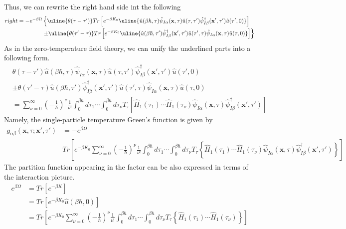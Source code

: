 Thus, we can rewrite the right hand side int the following
$$
\begin{aligned}
right=-e^{-\beta\Omega} & \left\{\uline{\theta(\tau-\tau')} Tr \left[ e^{-\beta K_0} \uline{\hat{u}(\beta\hbar,\tau) \hat{\psi}_{I\alpha}(\mathbf{x},\tau) \hat{u}(\tau,\tau') \hat{\psi}_{I\beta}^{\dagger}(\mathbf{x'},\tau') \hat{u}(\tau',0)} \right] \right.\\
&\left.\pm \uline{\theta(\tau'-\tau)} Tr\left[e^{-\beta K_0} \uline{\hat{u}(\beta\hbar,\tau') \hat{\psi}_{I\beta}^{\dagger}(\mathbf{x'},\tau') \hat{u}(\tau',\tau) \hat{\psi}_{I\alpha}(\mathbf{x},\tau) \hat{u}(\tau,0)}\right] \right\}
\end{aligned}
$$
As in the zero-temperature field theory, we can unify the underlined parts into a following form.
$$
\begin{aligned}
&\theta(\tau-\tau') \hat{u}(\beta\hbar,\tau) \hat{\psi}_{I\alpha}(\mathbf{x},\tau) \hat{u}(\tau,\tau') \hat{\psi}_{I\beta}^{\dagger}(\mathbf{x'},\tau') \hat{u}(\tau',0)\\
&\pm \theta(\tau'-\tau) \hat{u}(\beta\hbar,\tau') \hat{\psi}_{I\beta}^{\dagger}(\mathbf{x'},\tau') \hat{u}(\tau',\tau) \hat{\psi}_{I\alpha}(\mathbf{x},\tau) \hat{u}(\tau,0)\\
&=\sum_{\nu=0}^{\infty}\left(-\frac{1}{\hbar}\right)^{\nu}\frac{1}{\nu!}\int_{0}^{\beta\hbar}d\tau_1 \cdots \int_{0}^{\beta\hbar}d\tau_\nu T_\tau \left[\hat{H}_1(\tau_1) \cdots \hat{H}_1(\tau_\nu)\hat{\psi}_{I\alpha}(\mathbf{x},\tau) \hat{\psi}_{I\beta}^{\dagger}(\mathbf{x'},\tau')\right]
\end{aligned}
$$
Namely, the single-particle temperature Green's function is given by
\begin{equation}
\begin{aligned}
g_{\alpha\beta}(\mathbf{x},\tau;\mathbf{x'},\tau')&=-e^{\beta\Omega}\\
&Tr\left[e^{-\beta K_0} \sum_{\nu=0}^{\infty}\left(-\frac{1}{\hbar}\right)^{\nu}\frac{1}{\nu!}\int_{0}^{\beta\hbar}d\tau_1 \cdots \int_{0}^{\beta\hbar}d\tau_\nu T_\tau \left\{\hat{H}_1(\tau_1) \cdots \hat{H}_1(\tau_\nu)\hat{\psi}_{I\alpha}(\mathbf{x},\tau) \hat{\psi}_{I\beta}^{\dagger}(\mathbf{x'},\tau')\right\}\right]
\end{aligned}
\end{equation}
The partition function appearing in the factor can be also expressed in terms of the interaction picture.%
\begin{equation}
\begin{aligned}
e^{\beta\Omega}&=Tr\left[e^{-\beta K}\right]\\
&=Tr\left[e^{-\beta K_0}\hat{u}(\beta\hbar,0)\right]\\
&=Tr\left[e^{-\beta K_0}\sum_{\nu=0}^{\infty}\left(-\frac{1}{\hbar}\right)^{\nu}\frac{1}{\nu!}\int_{0}^{\beta\hbar}d\tau_1 \cdots \int_{0}^{\beta\hbar}d\tau_\nu T_\tau \left\{\hat{H}_1(\tau_1) \cdots \hat{H}_1(\tau_\nu)\right\}\right]
\end{aligned}
\end{equation}
